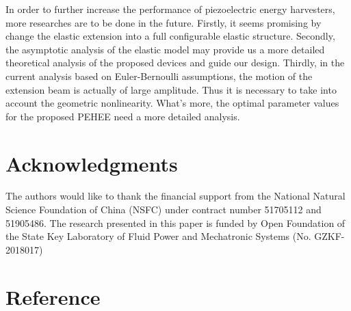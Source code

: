 \documentclass{elsarticle}
\begin{document}
In order to further increase the performance of piezoelectric energy harvesters, more researches are to be done in the future. Firstly, it seems promising by change the elastic extension into a full configurable elastic structure. Secondly, the asymptotic analysis of the elastic model may provide us a more detailed theoretical analysis of the proposed devices and guide our design. Thirdly, in the current analysis based on Euler-Bernoulli assumptions, the motion of the extension beam is actually of large amplitude. Thus it is necessary to take into account the geometric nonlinearity. What's more, the optimal parameter values for the proposed PEHEE need a more detailed analysis.

\section*{Acknowledgments}
The authors would like to thank the financial support from the National Natural Science Foundation of China (NSFC) under contract number 51705112 and 51905486. The research presented in this paper is funded by Open Foundation of the State Key Laboratory of Fluid Power and Mechatronic Systems (No. GZKF-2018017)


\section*{Reference}



\end{document}
